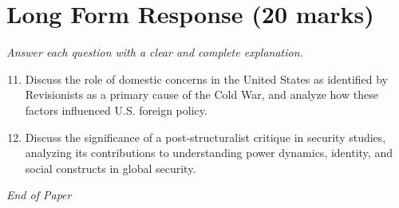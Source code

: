 \documentclass[12pt]{article}
\begin{document}
\section*{Long Form Response (20 marks)}
\textit{Answer each question with a clear and complete explanation.}
\begin{enumerate}[label=\arabic*.]
\setcounter{enumi}{10}
\item Discuss the role of domestic concerns in the United States as identified by Revisionists as a primary cause of the Cold War, and analyze how these factors influenced U.S. foreign policy.
\item Discuss the significance of a post-structuralist critique in security studies, analyzing its contributions to understanding power dynamics, identity, and social constructs in global security.
\end{enumerate}

\vfill
\noindent\textit{End of Paper}
\end{document}
